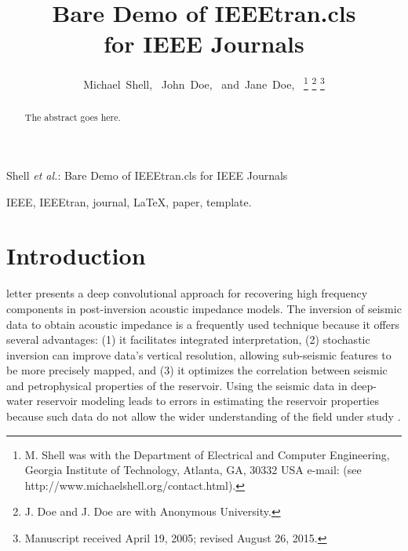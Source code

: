 \documentclass[journal]{IEEEtran}
\begin{document}
\title{Bare Demo of IEEEtran.cls\\ for IEEE Journals}


\author{Michael~Shell,~
        John~Doe,~
        and~Jane~Doe,~%
\thanks{M. Shell was with the Department
of Electrical and Computer Engineering, Georgia Institute of Technology, Atlanta,
GA, 30332 USA e-mail: (see http://www.michaelshell.org/contact.html).}%
\thanks{J. Doe and J. Doe are with Anonymous University.}%
\thanks{Manuscript received April 19, 2005; revised August 26, 2015.}}

%
{Shell \MakeLowercase{\textit{et al.}}: Bare Demo of IEEEtran.cls for IEEE Journals}

\maketitle

\begin{abstract}
The abstract goes here.
\end{abstract}

\begin{IEEEkeywords}
IEEE, IEEEtran, journal, \LaTeX, paper, template.
\end{IEEEkeywords}

\IEEEpeerreviewmaketitle



\section{Introduction}

 letter presents a deep convolutional
approach for recovering high frequency components in
post-inversion acoustic impedance models. The inversion of
seismic data to obtain acoustic impedance is a frequently
used technique because it offers several advantages: (1) it
facilitates integrated interpretation, (2) stochastic
inversion can improve data's vertical resolution, allowing
sub-seismic features to be more precisely mapped, and (3)
it optimizes the correlation between seismic and petrophysical
properties of the reservoir. Using the seismic data in
deep-water reservoir modeling leads to errors in estimating
the reservoir properties because such data do not allow the
wider understanding of the field under study \cite{Sergio2016}.
\end{document}
